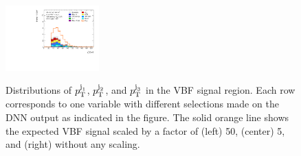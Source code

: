\begin{figure}[h]
{            \includegraphics[width=0.32\textwidth]{figures/hww/dnn/blinded/run2-emme-CutVBFSR_DNN87-subleadJetPt-lin.pdf}
        } \\
        {\caption{Distributions of $\mbox{\ensuremath{p}}_{\text{T}}^{\text{j}_{1}}$, $\mbox{\ensuremath{p}}_{\text{T}}^{\text{j}_{2}}$, and $\mbox{\ensuremath{p}}_{\text{T}}^{\text{j}_{3}}$ in the VBF \TwoJet signal region.
                Each row corresponds to one variable with different selections made on the DNN output as indicated in the figure. The solid orange line shows the expected VBF signal scaled by a factor of (left) 50, (center) 5, and (right) without any scaling.
                \label{fig:dnn-inputs-vbf-top3}}}
    \end{figure}


